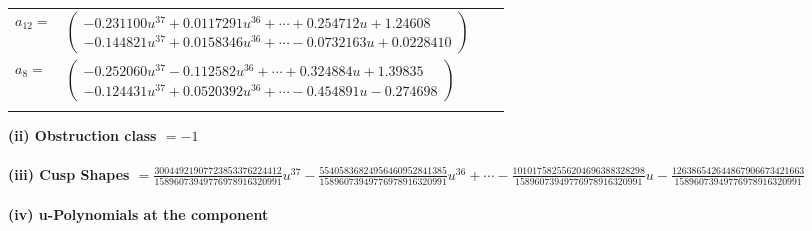 \documentclass[1p]{elsarticle_modified}
\theoremstyle{definition}
\begin{document}
\begin{tabular}{m{7pt} m{180pt} m{7pt} m{180pt} }
\flushright $a_{12}=$&$\begin{pmatrix}-0.231100 u^{37}+0.0117291 u^{36}+\cdots+0.254712 u+1.24608\\-0.144821 u^{37}+0.0158346 u^{36}+\cdots-0.0732163 u+0.0228410\end{pmatrix}$ \\
\flushright $a_{8}=$&$\begin{pmatrix}-0.252060 u^{37}-0.112582 u^{36}+\cdots+0.324884 u+1.39835\\-0.124431 u^{37}+0.0520392 u^{36}+\cdots-0.454891 u-0.274698\end{pmatrix}$\\&\end{tabular}
\flushleft \textbf{(ii) Obstruction class $= -1$}\\~\\
\flushleft \textbf{(iii) Cusp Shapes $= \frac{30044921907723853376224412}{15896073949776978916320991} u^{37}-\frac{55405836824956460952841385}{15896073949776978916320991} u^{36}+\cdots-\frac{101017582556204696388328298}{15896073949776978916320991} u-\frac{126386542644867906673421663}{15896073949776978916320991}$}\\~\\
\newpage\renewcommand{\arraystretch}{1}
\flushleft \textbf{(iv) u-Polynomials at the component}\newline \\
\end{document}
